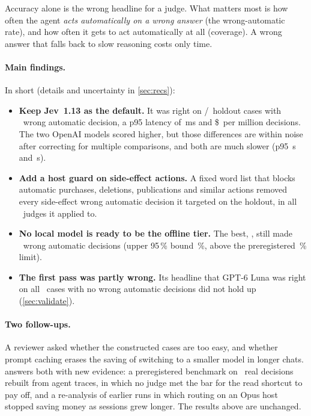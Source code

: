 \begin{keyidea}
Accuracy alone is the wrong headline for a judge. What matters most is how often the agent
\emph{acts automatically on a wrong answer} (the wrong-automatic rate), and how often it gets to act
automatically at all (coverage). A wrong answer that falls back to slow reasoning costs only time.
\end{keyidea}

\paragraph{Main findings.} In short (details and uncertainty in \cref{sec:recs}):
\begin{itemize}
  \item \textbf{Keep Jev~1.13 as the default.} It was right on \JevHoldAccK/\HoldN\ holdout cases with
    \JevHoldWaK\ wrong automatic decision, a p95 latency of \JevHoldPninetyfive\,ms and
    \$\JevHoldCost\ per million decisions. The two OpenAI models scored higher, but those differences
    are within noise after correcting for multiple comparisons, and both are much slower
    (p95 \LunaHoldPninetyfiveS\,s and \SolHoldPninetyfiveS\,s).
  \item \textbf{Add a host guard on side-effect actions.} A fixed word list that blocks automatic
    purchases, deletions, publications and similar actions removed every side-effect wrong automatic
    decision it targeted on the holdout, in all \ITwoHoldNApplicable\ judges it applied to.
  \item \textbf{No local model is ready to be the offline tier.} The best, \OffBestHold, still made
    \TevFourHoldOffWaK\ wrong automatic decisions (upper 95\,\% bound \TevFourHoldOffWaUpper\,\%,
    above the preregistered \OffMaxUpperPct\,\% limit).
  \item \textbf{The first pass was partly wrong.} Its headline that GPT-6 Luna was right on all
    \DevN\ cases with no wrong automatic decisions did not hold up (\cref{sec:validate}).
\end{itemize}

\paragraph{Two follow-ups.} A reviewer asked whether the constructed cases are too easy, and whether prompt
caching erases the saving of switching to a smaller model in longer chats.  answers
both with new evidence: a preregistered benchmark on \TrN\ real decisions rebuilt from agent traces, in
which no judge met the bar for the read shortcut to pay off, and a re-analysis of earlier runs in which
routing on an Opus host stopped saving money as sessions grew longer. The results above are unchanged.

